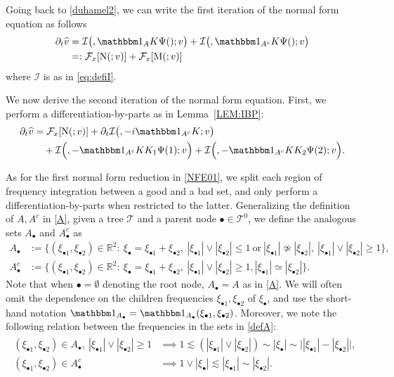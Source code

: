 \documentclass[%
11pt,  reqno]{amsart}
\makeatletter
\newcommand{\5}{\textup{V}}
\newcommand{\noi}{\noindent}
\newcommand{\ft}{\widehat}
\newcommand{\ind}{\mathbbm 1}
\newcommand{\les}{\lesssim}
\newcommand{\dt}{\partial_t}
\theoremstyle{remark}
\newcommand{\R}{\mathbb{R}}
\newcommand{\bul}{\bullet}
\newcommand{\TT}{\mathcal{T}}
\newcommand{\Ft}{{\mathcal{F}}}
\def\<#1>{\csname MH@symb@#1\endcsname}
\newcommand{\Ical}{\mathcal{I}}
\numberwithin{equation}{section}
\numberwithin{theorem}{section}
\newcommand{\MM}{\mathrm{M}}
\newcommand{\NN}{\mathrm{N}}
\makeatother
\begin{document}
Going back to \eqref{duhamel2}, we can write the first iteration of the normal form equation as follows
\begin{align}
\dt\ft v
&
= 
\Ical\big( \<1>, \ind_A K \Psi(\<1>); v 
\big)
+ \Ical\big( \<1>, \ind_{A^c} K \Psi(\<1>) ;v 
\big)
\\
&
=: \Ft_x[ \NN ( \<1>; v )] + \Ft_x[ \MM(\<1>; v) ] 
\label{NFE000}
\end{align}
where $\Ical$ is as in \eqref{eq:defiI}.

We now derive the second iteration of the normal form equation. 
First, we perform a differentiation-by-parts as in Lemma~\ref{LEM:IBP}:
\begin{align}
\label{NFE00}
\begin{split}
\dt\ft v 
&
=
 \Ft_x[ \NN ( \<1>; v )] 
+ 
\dt\Ical \big( \<1>,  - i \ind_{A^c} K; v \big) 
\\
&
\quad 
+
\Ical \Big( \<21>, - \ind_{A^c} KK_1\Psi(1) ; v  \Big) 
+
\Ical \Big( \<22>, - \ind_{A^c} KK_2\Psi(2) ; v  \Big) 
. 
\end{split}
\end{align}

\noi
As for the first normal form reduction in \eqref{NFE01}, we split each region of frequency integration between a good and a bad set, and only perform a differentiation-by-parts when restricted to the latter. Generalizing the definition of $A, A^c$ in \eqref{A}, given a tree $\TT$ and a parent node $\bul \in \TT^0$, we define the analogous sets $A_\bul$ and $A_\bul^c$ as
\begin{align}
A_\bul& 
:=
 \big\{ (\xi_{\bul1}, \xi_{\bul2}) \in \R^2: \ \xi_\bul =
\xi_{\bul1}
+ \xi_{\bul2}, \ |\xi_{\bul1}| \lor  |\xi_{\bul2}|  \le 1 
\ \text{or}
\
|\xi_{\bul1} | \not \simeq |\xi_{\bul2}| , \ |\xi_{\bul1}| \lor |\xi_{\bul2}| \ge 1
 \big\} , \\
A_\bul^c & := \big\{ (\xi_{\bul1}, \xi_{\bul2}) \in \R^2: \ \xi_\bul =
\xi_{\bul1} +
\xi_{\bul2},\
|\xi_{\bul1}| \lor |\xi_{\bul2}| \ge1
 , |\xi_{\bul1} |  \simeq |\xi_{\bul2}| 
\big\} 
.
\label{defA}
\end{align}
Note that when $\bul = \emptyset$ denoting the root node, $A_\bul =A$ as in \eqref{A}. 
We will often omit the dependence on the children frequencies $\xi_{\bul 1}, \xi_{\bul2}$ of $\xi_\bul$, and use the short-hand notation $\ind_{A_\bul}=\ind_{A_\bul} (\xi_{\bul1},\xi_{\bul2})$.
Moreover, we note the following relation between the frequencies in the sets in \eqref{defA}:
\begin{align}
\label{defA2}
\begin{split}
(\xi_{\bul1}, \xi_{\bul2}) \in A_\bul , \
|\xi_{\bul1}| \lor |\xi_{\bul2}| \ge 1
&
\implies 1 \les (|\xi_{\bul1}| \lor |\xi_{\bul2}|) \sim |\xi_\bul| \sim \big| | \xi_{\bul1}| - |\xi_{\bul2}| \big|
,
\\
(\xi_{\bul1}, \xi_{\bul2}) \in A_\bul^{c} 
&
\implies 1 \lor  |\xi_{\bul}|  \les |\xi_{\bul1}| \sim |\xi_{\bul2}|
.
\end{split}
\end{align}
\end{document}
